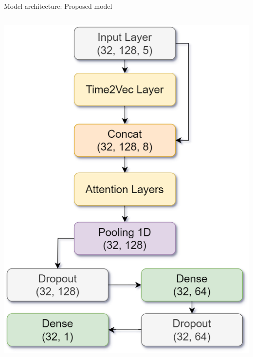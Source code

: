 \documentclass[compress, mathserif, fleqn, 10pt]{beamer}
\begin{document}
\begin{frame}{Model architecture: Proposed model}
\begin{columns}
\begin{column}{0.45\textwidth}
				\centerline{\includegraphics[width=\textwidth]{images/model-mini.eps}}
			\end{column}
		\end{columns}
	\end{frame}
	
\end{document}

